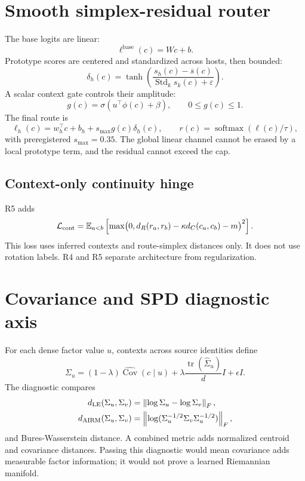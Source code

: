 \documentclass[11pt,a4paper]{article}
\begin{document}
\section{Smooth simplex-residual router}
The base logits are linear:
\[
\ell^{\mathrm{base}}(c)=Wc+b.
\]
Prototype scores are centered and standardized across hosts, then bounded:
\[
\delta_h(c)=\tanh\!\left(\frac{s_h(c)-\overline s(c)}{\operatorname{Std}_k s_k(c)+\varepsilon}\right).
\]
A scalar context gate controls their amplitude:
\[
g(c)=\sigma(u^\top\phi(c)+\beta),\qquad 0\le g(c)\le 1.
\]
The final route is
\[
\ell_h(c)=w_h^\top c+b_h+s_{\max}g(c)\delta_h(c),\qquad r(c)=\operatorname{softmax}(\ell(c)/\tau),
\]
with preregistered $s_{\max}=0.35$. The global linear channel cannot be erased by a local prototype term, and the residual cannot exceed the cap.
\subsection{Context-only continuity hinge}
R5 adds
\[
\mathcal L_{\mathrm{cont}}=\mathbb E_{a<b}\left[\max\bigl(0,d_R(r_a,r_b)-\kappa d_C(c_a,c_b)-m\bigr)^2\right].
\]
This loss uses inferred contexts and route-simplex distances only. It does not use rotation labels. R4 and R5 separate architecture from regularization.
\section{Covariance and SPD diagnostic axis}
For each dense factor value $u$, contexts across source identities define
\[
\Sigma_u=(1-\lambda)\widehat{\operatorname{Cov}}(c\mid u)+\lambda\frac{\operatorname{tr}(\widehat\Sigma_u)}{d}I+\epsilon I.
\]
The diagnostic compares
\begin{align}
d_{\mathrm{LE}}(\Sigma_u,\Sigma_v)&=\left\lVert \log\Sigma_u-\log\Sigma_v\right\rVert_F,\\
d_{\mathrm{AIRM}}(\Sigma_u,\Sigma_v)&=\left\lVert \log(\Sigma_u^{-1/2}\Sigma_v\Sigma_u^{-1/2})\right\rVert_F,
\end{align}
and Bures-Wasserstein distance. A combined metric adds normalized centroid and covariance distances. Passing this diagnostic would mean covariance adds measurable factor information; it would not prove a learned Riemannian manifold.
\end{document}
